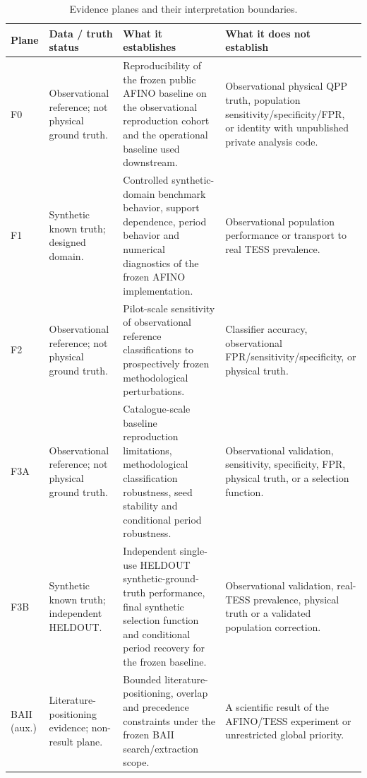 \begin{table}[htbp]
\centering
\caption{Evidence planes and their interpretation boundaries.}
\label{tab:evidence_planes}
\small
\begin{tabularx}{\textwidth}{@{}>{\RaggedRight\arraybackslash}p{1.15cm}>{\RaggedRight\arraybackslash}p{3.25cm}>{\RaggedRight\arraybackslash}X>{\RaggedRight\arraybackslash}X@{}}
\toprule
Plane & Data / truth status & What it establishes & What it does not establish \\
\midrule
F0 & Observational reference; not physical ground truth. & Reproducibility of the frozen public AFINO baseline on the observational reproduction cohort and the operational baseline used downstream. & Observational physical QPP truth, population sensitivity/specificity/FPR, or identity with unpublished private analysis code. \\
F1 & Synthetic known truth; designed domain. & Controlled synthetic-domain benchmark behavior, support dependence, period behavior and numerical diagnostics of the frozen AFINO implementation. & Observational population performance or transport to real TESS prevalence. \\
F2 & Observational reference; not physical ground truth. & Pilot-scale sensitivity of observational reference classifications to prospectively frozen methodological perturbations. & Classifier accuracy, observational FPR/sensitivity/specificity, or physical truth. \\
F3A & Observational reference; not physical ground truth. & Catalogue-scale baseline reproduction limitations, methodological classification robustness, seed stability and conditional period robustness. & Observational validation, sensitivity, specificity, FPR, physical truth, or a selection function. \\
F3B & Synthetic known truth; independent HELDOUT. & Independent single-use HELDOUT synthetic-ground-truth performance, final synthetic selection function and conditional period recovery for the frozen baseline. & Observational validation, real-TESS prevalence, physical truth or a validated population correction. \\
BAII (aux.) & Literature-positioning evidence; non-result plane. & Bounded literature-positioning, overlap and precedence constraints under the frozen BAII search/extraction scope. & A scientific result of the AFINO/TESS experiment or unrestricted global priority. \\
\bottomrule
\end{tabularx}
\end{table}
